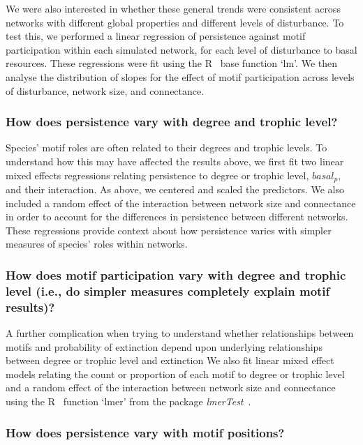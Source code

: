 \documentclass[12pt]{article}
\begin{document}
\begin{spacing}{2.0}
            We were also interested in whether these general trends were consistent across networks with different global properties and different levels of disturbance. 
            To test this, we performed a linear regression of persistence against motif participation within each simulated network, for each level of disturbance to basal resources.
            These regressions were fit using the R~\citep{R} base function `lm'.
            We then analyse the distribution of slopes for the effect of motif participation across levels of disturbance, network size, and connectance. 
        

        \subsubsection*{How does persistence vary with degree and trophic level?}
        
            Species' motif roles are often related to their degrees and trophic levels.
            To understand how this may have affected the results above, we first fit two linear mixed effects regressions relating persistence to degree or trophic level, $basal_p$, and their interaction.
            As above, we centered and scaled the predictors.
            We also included a random effect of the interaction between network size and connectance in order to account for the differences in persistence between different networks. 
            These regressions provide context about how persistence varies with simpler measures of species' roles within networks.
                    
        
        \subsubsection*{How does motif participation vary with degree and trophic level (i.e., do simpler measures completely explain motif results)?}

            A further complication when trying to understand whether relationships between motifs and probability of extinction depend upon underlying relationships between degree or trophic level and extinction 
            We also fit linear mixed effect models relating the count or proportion of each motif to degree or trophic level and a random effect of the interaction between network size and connectance using the R~\citep{R} function `lmer' from the package \emph{lmerTest}~\citep{lmerTest}.

        
        \subsubsection*{How does persistence vary with motif positions?}
        

\end{spacing}
\end{document}
